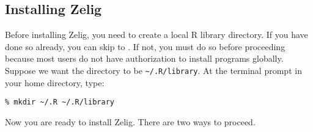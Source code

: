 \documentclass{article}
\begin{document}
\subsection{Installing Zelig}\label{sss:unix.library}

Before installing Zelig, you need to create a local R library
directory. If you have done so already, you can skip to
. If not, you must do so before proceeding because
most users do not have authorization to install programs globally.
Suppose we want the directory to be {\tt \~{}/.R/library}.  At the
terminal prompt in your home directory, type:
\begin{verbatim}
% mkdir ~/.R ~/.R/library
\end{verbatim}
Now you are ready to install Zelig.\label{unix.zelig} There are two
ways to proceed.
\end{document}
